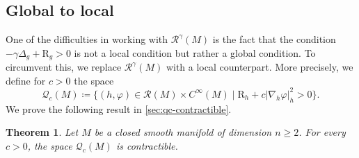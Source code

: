 \documentclass[11pt]{amsart}
\numberwithin{equation}{section}
\newtheorem{theorem}{Theorem}[section]
\newcommand{\Riem}{\mathcal{R}}
\newcommand{\scal}{\mathrm{R}}
\newcommand{\Laplace}{\Delta}
\newcommand{\Q}{\mathcal Q}
\let\geq\geqslant
\begin{document}
\subsection{Global to local}\label{sec:loctoglob}
One of the difficulties in working with $\Riem^\gamma(M)$ is the fact that the condition $-\gamma\Laplace_g+\scal_g>0$ is not a local condition but rather a global condition.
To circumvent this, we replace $\Riem^\gamma(M)$ with a local counterpart.
More precisely, we define for $c>0$ the space
\begin{equation}\label{eqn:QcmYeah}
 \Q_c(M)\coloneqq \{(h,\varphi)\in \Riem(M)\times C^\infty(M)\mid \scal_h+c|\nabla_h\varphi|_h^2>0\}.
\end{equation}
We prove the following result in \cref{sec:qc-contractible}.
\begin{theorem}\label{thm:main}
Let $M$ be a closed smooth manifold of dimension $n\geq 2$. For every $c>0$, the space $\Q_c(M)$ is contractible.
\end{theorem}
  
\end{document}
